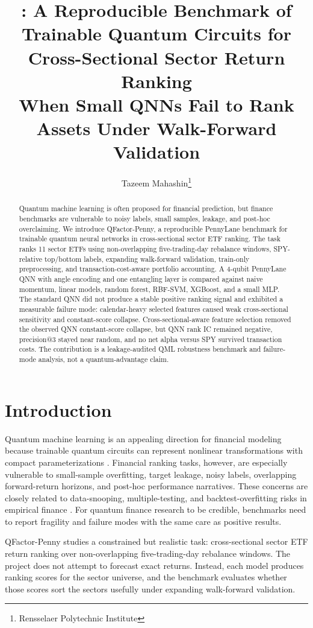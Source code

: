 \documentclass[11pt]{article}
\title{\textbf{\project: A Reproducible Benchmark of Trainable Quantum Circuits for Cross-Sectional Sector Return Ranking}\\[1.25em]
\large When Small QNNs Fail to Rank Assets Under Walk-Forward Validation}
\author{Tazeem Mahashin\thanks{Rensselaer Polytechnic Institute}}
\date{}
\makeatletter
\newcommand{\project}{QFactor-Penny}
\newcommand{\keyresult}{Cross-sectional-aware feature selection removed the observed QNN constant-score collapse, but QNN rank IC remained negative, precision@3 stayed near random, and no net alpha versus SPY survived transaction costs.}
\makeatother
\begin{document}
\maketitle

\begin{abstract}
Quantum machine learning is often proposed for financial prediction, but finance benchmarks are vulnerable to noisy labels, small samples, leakage, and post-hoc overclaiming. We introduce \project, a reproducible PennyLane benchmark for trainable quantum neural networks in cross-sectional sector ETF ranking. The task ranks 11 sector ETFs using non-overlapping five-trading-day rebalance windows, SPY-relative top/bottom labels, expanding walk-forward validation, train-only preprocessing, and transaction-cost-aware portfolio accounting. A 4-qubit PennyLane QNN with angle encoding and one entangling layer is compared against naive momentum, linear models, random forest, RBF-SVM, XGBoost, and a small MLP. The standard QNN did not produce a stable positive ranking signal and exhibited a measurable failure mode: calendar-heavy selected features caused weak cross-sectional sensitivity and constant-score collapse. \keyresult{} The contribution is a leakage-audited QML robustness benchmark and failure-mode analysis, not a quantum-advantage claim.
\end{abstract}

\section{Introduction}

Quantum machine learning is an appealing direction for financial modeling because trainable quantum circuits can represent nonlinear transformations with compact parameterizations \cite{cerezo2021vqa,schuld2021encoding}. Financial ranking tasks, however, are especially vulnerable to small-sample overfitting, target leakage, noisy labels, overlapping forward-return horizons, and post-hoc performance narratives. These concerns are closely related to data-snooping, multiple-testing, and backtest-overfitting risks in empirical finance \cite{white2000reality,bailey2017pbo,harvey2016crosssection}. For quantum finance research to be credible, benchmarks need to report fragility and failure modes with the same care as positive results.

\project{} studies a constrained but realistic task: cross-sectional sector ETF return ranking over non-overlapping five-trading-day rebalance windows. The project does not attempt to forecast exact returns. Instead, each model produces ranking scores for the sector universe, and the benchmark evaluates whether those scores sort the sectors usefully under expanding walk-forward validation.
\end{document}
